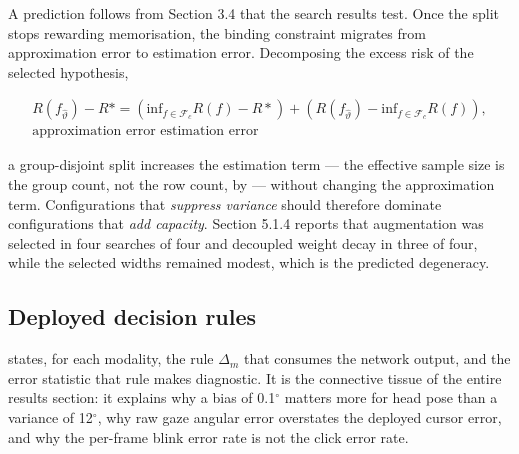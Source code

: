 A prediction follows from Section 3.4 that the search results test. Once the split stops rewarding memorisation, the binding constraint migrates from approximation error to estimation error. Decomposing the excess risk of the selected hypothesis,

\begin{equation}
\label{eq:104}
\begin{aligned}
R(f_{\hat{\vartheta }}) - R* = ( \mathrm{inf}_{f \in \mathcal{F}_c} R(f) - R* ) + ( R(f_{\hat{\vartheta }}) - \mathrm{inf}_{f \in \mathcal{F}_c} R(f) ) , \\ 
\text{approximation error estimation error}
\end{aligned}
\end{equation}

a group-disjoint split increases the estimation term --- the effective sample size is the group count, not the row count, by  --- without changing the approximation term. Configurations that \emph{suppress variance} should therefore dominate configurations that \emph{add capacity}. Section 5.1.4 reports that augmentation was selected in four searches of four and decoupled weight decay in three of four, while the selected widths remained modest, which is the predicted degeneracy.

\FloatBarrier

\subsection{Deployed decision rules}

 states, for each modality, the rule $\Delta_{m}$ that consumes the network output, and the error statistic that rule makes diagnostic. It is the connective tissue of the entire results section: it explains why a bias of 0.1$^{\circ}$ matters more for head pose than a variance of 12$^{\circ}$, why raw gaze angular error overstates the deployed cursor error, and why the per-frame blink error rate is not the click error rate.

